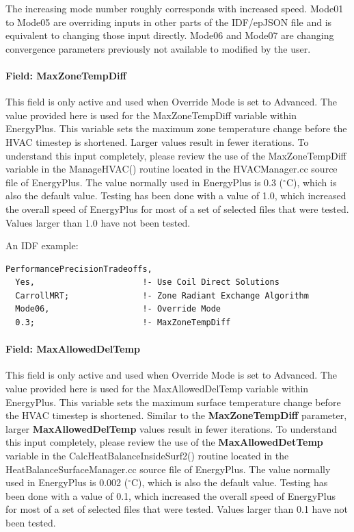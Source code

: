 The increasing mode number roughly corresponds with increased speed. Mode01 to Mode05 are overriding inputs in other parts of the IDF/epJSON file and is equivalent to changing those input directly. Mode06 and Mode07 are changing convergence parameters previously not available to modified by the user.

\paragraph{Field: MaxZoneTempDiff}\label{max-zone-temp-diff}

This field is only active and used when Override Mode is set to Advanced. The value provided here is used for the MaxZoneTempDiff variable within EnergyPlus. This variable sets the maximum zone temperature change before the HVAC timestep is shortened. Larger values result in fewer iterations. To understand this input completely, please review the use of the MaxZoneTempDiff variable in the ManageHVAC() routine located in the HVACManager.cc source file of EnergyPlus. The value normally used in EnergyPlus is 0.3 ($^\circ$C), which is also the default value. Testing has been done with a value of 1.0, which increased the overall speed of EnergyPlus for most of a set of selected files that were tested. Values larger than 1.0 have not been tested.


An IDF example:

\begin{lstlisting}
PerformancePrecisionTradeoffs,
  Yes,                      !- Use Coil Direct Solutions
  CarrollMRT;               !- Zone Radiant Exchange Algorithm
  Mode06,                   !- Override Mode
  0.3;                      !- MaxZoneTempDiff
\end{lstlisting}

\paragraph{Field: MaxAllowedDelTemp}\label{max-allowed-del-temp}

This field is only active and used when Override Mode is set to Advanced. The value provided here is used for the MaxAllowedDelTemp variable within EnergyPlus. This variable sets the maximum surface temperature change before the HVAC timestep is shortened. Similar to the \textbf{MaxZoneTempDiff} parameter, larger \textbf{MaxAllowedDelTemp} values result in fewer iterations. To understand this input completely, please review the use of the \textbf{MaxAllowedDetTemp} variable in the CalcHeatBalanceInsideSurf2() routine located in the HeatBalanceSurfaceManager.cc source file of EnergyPlus. The value normally used in EnergyPlus is 0.002 ($^\circ$C), which is also the default value. Testing has been done with a value of 0.1, which increased the overall speed of EnergyPlus for most of a set of selected files that were tested. Values larger than 0.1 have not been tested.


